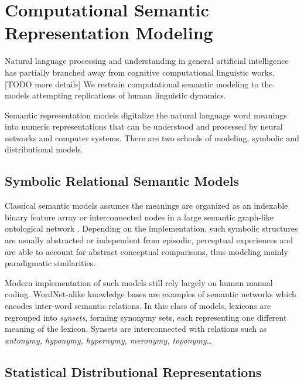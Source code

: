 
\section{Computational Semantic Representation Modeling}

Natural language processing and understanding in general artificial intelligence has partially branched away from cognitive computational linguistic works. [TODO more details] We restrain computational semantic modeling to the models attempting replications of human linguistic dynamics. 

Semantic representation models digitalize the natural language word meanings into numeric representations that can be understood and processed by neural networks and computer systems. There are two schools of modeling, symbolic and distributional models.

\subsection{Symbolic Relational Semantic Models}

\label{subsection:symbolicembedding}
Classical semantic models assumes the meanings are organized as an indexable binary feature array \parencite{smithSemanticMemoryPsychological1974} or interconnected nodes in a large semantic graph-like ontological network \parencite{collinsRetrievalTimeSemantic1969}. Depending on the implementation, such symbolic structures are usually abstracted or independent from episodic, perceptual experiences and are able to account for abstract conceptual comparisons, thus modeling mainly paradigmatic similarities. 

Modern implementation of such models still rely largely on human manual coding. WordNet-alike \parencite{millerWordNetLexicalDatabase1995, millerWordNetElectronicLexical1998, sagotBuildingFreeFrench2008, pradetWonefImprovedExpanded2014} knowledge bases are examples of semantic networks which encodes inter-word semantic relations. In this class of models, lexicons are regrouped into \emph{synsets}, forming synonymy sets, each representing one different meaning of the lexicon. Synsets are interconnected with relations such as \emph{antonymy, hyponymy, hypernymy, meronymy, toponymy}\dots

\subsection{Statistical Distributional Representations}

